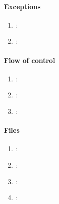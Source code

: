 \paragraph{Exceptions} %
\label{par:exceptions}

\begin{enumerate} [resume]
	\item \emph{\checkAZ}:
	\item \emph{\checkBA}:
\end{enumerate}

\paragraph{Flow of control} %
\label{par:flow_of_control}

\begin{enumerate} [resume]
	\item \emph{\checkBB}:
	\item \emph{\checkBC}:
	\item \emph{\checkBD}:
\end{enumerate}

\paragraph{Files} %
\label{par:files}

\begin{enumerate} [resume]
	\item \emph{\checkBE}:
	\item \emph{\checkBF}:
	\item \emph{\checkBG}:
	\item \emph{\checkBH}:
\end{enumerate}
